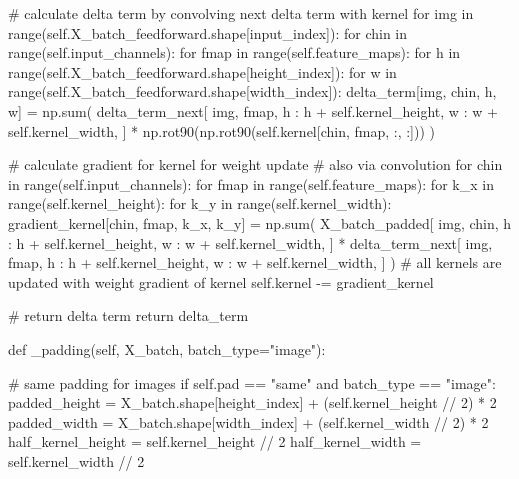 \documentclass[%
oneside,                 %
final,                   %
10pt]{article}
\begin{document}
        # calculate delta term by convolving next delta term with kernel
        for img in range(self.X_batch_feedforward.shape[input_index]):
            for chin in range(self.input_channels):
                for fmap in range(self.feature_maps):
                    for h in range(self.X_batch_feedforward.shape[height_index]):
                        for w in range(self.X_batch_feedforward.shape[width_index]):
                            delta_term[img, chin, h, w] = np.sum(
                                delta_term_next[
                                    img,
                                    fmap,
                                    h : h + self.kernel_height,
                                    w : w + self.kernel_width,
                                ]
                                * np.rot90(np.rot90(self.kernel[chin, fmap, :, :]))
                            )

        # calculate gradient for kernel for weight update
        # also via convolution
        for chin in range(self.input_channels):
            for fmap in range(self.feature_maps):
                for k_x in range(self.kernel_height):
                    for k_y in range(self.kernel_width):
                        gradient_kernel[chin, fmap, k_x, k_y] = np.sum(
                            X_batch_padded[
                                img,
                                chin,
                                h : h + self.kernel_height,
                                w : w + self.kernel_width,
                            ]
                            * delta_term_next[
                                img,
                                fmap,
                                h : h + self.kernel_height,
                                w : w + self.kernel_width,
                            ]
                        )
        # all kernels are updated with weight gradient of kernel
        self.kernel -= gradient_kernel

        # return delta term
        return delta_term

    def _padding(self, X_batch, batch_type="image"):

        # same padding for images
        if self.pad == "same" and batch_type == "image":
            padded_height = X_batch.shape[height_index] + (self.kernel_height // 2) * 2
            padded_width = X_batch.shape[width_index] + (self.kernel_width // 2) * 2
            half_kernel_height = self.kernel_height // 2
            half_kernel_width = self.kernel_width // 2
\end{document}
